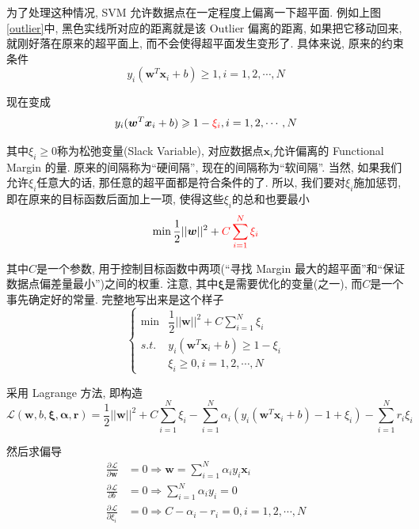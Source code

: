 \documentclass[a4paper,UTF8]{ctexart}
\theoremstyle{plain} \newtheorem{theorem}{定理}[section]
\theoremstyle{plain} \newtheorem{definition}{定义}[section]
\theoremstyle{plain} \newtheorem{lemma}{引理}[section]
\theoremstyle{plain} \newtheorem{proposition}{命题}[section]
\theoremstyle{plain} \newtheorem{example}{例}
\theoremstyle{plain} \newtheorem{remark}{注}
\theoremstyle{plain} \newtheorem{corollary}{推论}[section]
\newcommand{\p}[3]{\frac{\partial^{#1}#2}{\partial{#3}^{#1}}}  %
\begin{document}
为了处理这种情况, SVM 允许数据点在一定程度上偏离一下超平面. 例如上图\ref{outlier}中, 黑色实线所对应的距离就是该 Outlier 偏离的距离, 如果把它移动回来, 就刚好落在原来的超平面上, 而不会使得超平面发生变形了. 具体来说, 原来的约束条件
\begin{equation*}
y_{i} (\bm{w}^{T} \bm{x}_{i} + b) \geqslant 1, i = 1,2,\cdots,N
\end{equation*}

现在变成
\begin{equation*}
y_{i} (\bm{w}^{T} \bm{x}_{i} + b) \geqslant 1 - {\color{red}\xi_{i}}, i = 1,2,\cdots,N
\end{equation*}

其中$\xi_{i} \geqslant 0$称为松弛变量(Slack Variable), 对应数据点$\bm{x}_{i}$允许偏离的 Functional Margin 的量. 原来的间隔称为“硬间隔”, 现在的间隔称为“软间隔”. 当然, 如果我们允许$\xi_{i}$任意大的话, 那任意的超平面都是符合条件的了. 所以, 我们要对$\xi_{i}$施加惩罚, 即在原来的目标函数后面加上一项, 使得这些$\xi_{i}$的总和也要最小
\begin{equation*}
\min \frac{1}{2} ||\bm{w}||^2 + {\color{red}C \sum_{i=1}^{N} \xi_{i}}
\end{equation*}

其中$C$是一个参数, 用于控制目标函数中两项(“寻找 Margin 最大的超平面”和“保证数据点偏差量最小”)之间的权重. 注意, 其中$\bm{\xi}$是需要优化的变量(之一), 而$C$是一个事先确定好的常量. 完整地写出来是这个样子
$$
\begin{cases}
\min & \dfrac{1}{2} ||\bm{w}||^2 + C \sum_{i=1}^{N} \xi_{i} \\ 
s.t. & y_{i} (\bm{w}^{T} \bm{x}_{i} + b) \geqslant 1 - \xi_{i} \\ 
\quad & \xi_{i} \geqslant 0, i = 1,2,\cdots,N
\end{cases}
$$

采用 Lagrange 方法, 即构造
\begin{equation*}
\mathcal{L}(\bm{w},b,\bm{\xi},\bm{\alpha},\bm{r})  = \frac{1}{2} ||\bm{w}||^2 + C \sum_{i=1}^{N} \xi_{i} - \sum_{i=1}^{N} \alpha_{i} (y_{i}(\bm{w}^{T} \bm{x}_{i} + b) - 1 + \xi_{i}) - \sum_{i=1}^{N} r_{i}\xi_{i}
\end{equation*}

然后求偏导
\begin{align*}
\p{}{\mathcal{L}}{\bm{w}} & = 0 \Rightarrow \bm{w} = \sum_{i=1}^{N} \alpha_{i} y_{i} \bm{x}_{i} \\ 
\p{}{\mathcal{L}}{b} & = 0 \Rightarrow \sum_{i=1}^{N} \alpha_{i} y_{i} = 0 \\ 
\p{}{\mathcal{L}}{\xi_i} & = 0 \Rightarrow C - \alpha_i - r_i = 0 , i=1,2,\cdots,N 
\end{align*}
\end{document}
